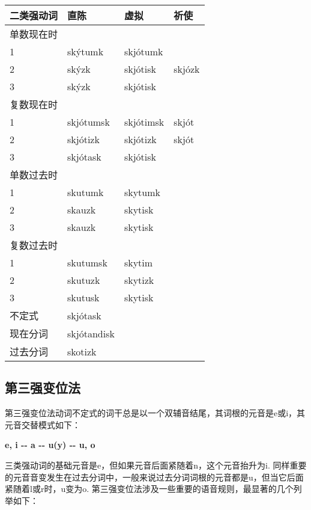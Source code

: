 \begin{longtable}{llll}
  \toprule
  二类强动词 & 直陈        & 虚拟      & 祈使   \\
  \midrule
  \endhead
  \bottomrule
  \endfoot
  单数现在时 &             &           &        \\
  1          & skýtumk     & skjótumk  &        \\
  2          & skýzk       & skjótisk  & skjózk \\
  3          & skýzk       & skjótisk  &        \\
  复数现在时 &             &           &        \\
  1          & skjótumsk   & skjótimsk & skjót  \\
  2          & skjótizk    & skjótizk  & skjót  \\
  3          & skjótask    & skjótisk  &        \\
  单数过去时 &             &           &        \\
  1          & skutumk     & skytumk   &        \\
  2          & skauzk      & skytisk   &        \\
  3          & skauzk      & skytisk   &        \\
  复数过去时 &             &           &        \\
  1          & skutumsk    & skytim    &        \\
  2          & skutuzk     & skytizk   &        \\
  3          & skutusk     & skytisk   &        \\
  不定式     & skjótask    &           &        \\
  现在分词   & skjótandisk &           &        \\
  过去分词   & skotizk     &           &        \\
\end{longtable}

\subsection{第三强变位法}\label{第三强变位法}

第三强变位法动词不定式的词干总是以一个双辅音结尾，其词根的元音是e或i，其元音交替模式如下：

\textbf{e, i -\/- a -\/- u(y) -\/- u, o}

三类强动词的基础元音是e，但如果元音后面紧随着n，这个元音抬升为i.
同样重要的元音音变发生在过去分词中，一般来说过去分词词根的元音都是u，但当它后面紧随着l或r时，u变为o.
第三强变位法涉及一些重要的语音规则，最显著的几个列举如下：

